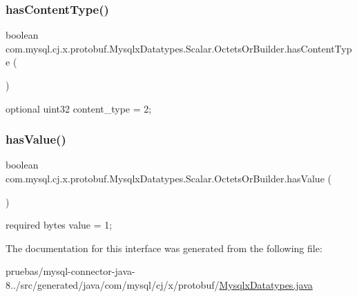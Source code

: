 \subsubsection{\texorpdfstring{has\+Content\+Type()}{hasContentType()}}
{\footnotesize\ttfamily boolean com.\+mysql.\+cj.\+x.\+protobuf.\+Mysqlx\+Datatypes.\+Scalar.\+Octets\+Or\+Builder.\+has\+Content\+Type (\begin{DoxyParamCaption}{ }\end{DoxyParamCaption})}

{\ttfamily optional uint32 content\+\_\+type = 2;} \mbox{\label{interfacecom_1_1mysql_1_1cj_1_1x_1_1protobuf_1_1_mysqlx_datatypes_1_1_scalar_1_1_octets_or_builder_a2596e5239331a6c435e18f17db0069fe}} 
\subsubsection{\texorpdfstring{has\+Value()}{hasValue()}}
{\footnotesize\ttfamily boolean com.\+mysql.\+cj.\+x.\+protobuf.\+Mysqlx\+Datatypes.\+Scalar.\+Octets\+Or\+Builder.\+has\+Value (\begin{DoxyParamCaption}{ }\end{DoxyParamCaption})}

{\ttfamily required bytes value = 1;} 

The documentation for this interface was generated from the following file\+:\begin{DoxyCompactItemize}
\item 
pruebas/mysql-\/connector-\/java-\/8../src/generated/java/com/mysql/cj/x/protobuf/\mbox{\hyperlink{_mysqlx_datatypes_8java}{Mysqlx\+Datatypes.\+java}}\end{DoxyCompactItemize}
